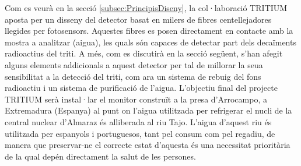 Com es veurà en la secció \ref{subsec:PrincipisDiseny}, la col·laboració TRITIUM aposta per un disseny del detector basat en milers de fibres centellejadores llegides per fotosensors. Aquestes fibres es posen directament en contacte amb la mostra a analitzar (aigua), les quals són capaces de detectar part dels decaïments radioactius del triti. A més, com es discutirà en la secció següent, s'han afegit alguns elements addicionals a aquest detector per tal de millorar la seua sensibilitat a la detecció del triti, com ara un sistema de rebuig del fons radioactiu i un sistema de purificació de l'aigua. L'objectiu final del projecte TRITIUM serà instal·lar el monitor construït a la presa d'Arrocampo, a Extremadura (Espanya) al punt on l'aigua utilitzada per refrigerar el nucli de la central nuclear d'Almaraz és alliberada al riu Tajo. L'aigua d'aquest riu és utilitzada per espanyols i portuguesos, tant pel consum com pel regadiu, de manera que preservar-ne el correcte estat d'aquesta és una necessitat prioritària de la qual depén directament la salut de les persones. 